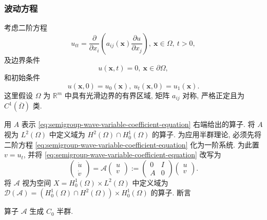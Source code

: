\subsubsection{波动方程}\label{subsec:semigroup-wave-equation}

考虑二阶方程
\begin{equation}\label{eq:semigroup-wave-variable-coefficient-equation}
u_{tt}=\dfrac{\partial}{\partial x_i}\left(a_{ij}(\bm{x})\dfrac{\partial u}{\partial x_j}\right),\ \bm{x}\in\Omega,\ t>0,
\end{equation}
及边界条件
\begin{equation}\label{eq:semigroup-wave-dirichlet-boundary}
u(\bm{x},t)=0,\ \bm{x}\in\partial\Omega,
\end{equation}
和初始条件
\begin{equation}\label{eq:semigroup-wave-displacement-velocity-initial-data}
u(\bm{x},0)=u_0(\bm{x}),\ u_t(\bm{x},0)=u_1(\bm{x}).
\end{equation}
这里假设 $\Omega$ 为 $\mathbb{R}^m$ 中具有光滑边界的有界区域, 矩阵 $a_{ij}$ 对称, 严格正定且为 $C^1(\overline\Omega)$ 类.

用 $A$ 表示 \eqref{eq:semigroup-wave-variable-coefficient-equation} 右端给出的算子. 将 $A$ 视为 $L^2(\Omega)$ 中定义域为 $H^2(\Omega)\cap H_0^1(\Omega)$ 的算子. 为应用半群理论, 必须先将二阶方程 \eqref{eq:semigroup-wave-variable-coefficient-equation} 化为一阶系统. 为此置 $v=u_t$, 并将 \eqref{eq:semigroup-wave-variable-coefficient-equation} 改写为
\begin{equation}\label{eq:semigroup-wave-first-order-operator-matrix}
\begin{pmatrix}\dot u\\\dot v\end{pmatrix}=\mathcal{A}\begin{pmatrix}u\\v\end{pmatrix}:=\begin{pmatrix}0&I\\A&0\end{pmatrix}\begin{pmatrix}u\\v\end{pmatrix}.
\end{equation}
将 $\mathcal{A}$ 视为空间 $X=H_0^1(\Omega)\times L^2(\Omega)$ 中定义域为 $\mathcal{D}(\mathcal{A})=(H_0^1(\Omega)\cap H^2(\Omega))\times H_0^1(\Omega)$ 的算子. 断言

\begin{Theorem}
\label{thm:semigroup-wave-generation}
算子 $\mathcal{A}$ 生成 $C_0$ 半群.
\end{Theorem}


